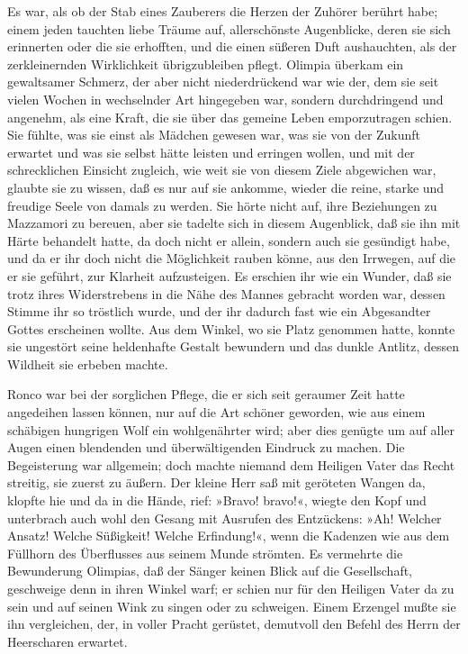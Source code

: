 \pagenum{[85]}Es war, als ob der Stab eines Zauberers die Herzen
der Zuhörer berührt habe; einem jeden tauchten liebe Träume auf,
allerschönste Augenblicke, deren sie sich erinnerten oder die sie
erhofften, und die einen süßeren Duft aushauchten, als der
zerkleinernden Wirklichkeit übrigzubleiben pflegt. Olimpia überkam
ein gewaltsamer Schmerz, der aber nicht niederdrückend war wie der,
dem sie seit vielen Wochen in wechselnder Art hingegeben war,
sondern durchdringend und angenehm, als eine Kraft, die sie über
das gemeine Leben emporzutragen schien. Sie fühlte, was sie einst
als Mädchen gewesen war, was sie von der Zukunft erwartet und was
sie selbst hätte leisten und erringen wollen, und mit der
schrecklichen Einsicht zugleich, wie weit sie von diesem Ziele
abgewichen war, glaubte sie zu wissen, daß es nur auf sie ankomme,
wieder die reine, starke und freudige Seele von damals zu werden.
Sie hörte nicht auf, ihre Beziehungen zu Mazzamori zu bereuen, aber
sie tadelte sich in diesem Augenblick, daß sie ihn mit Härte
behandelt hatte, da doch nicht er allein, sondern auch sie
gesündigt habe, und da er ihr doch nicht die Möglichkeit rauben
könne, aus den Irrwegen, auf die er sie geführt, zur Klarheit
aufzusteigen. Es erschien ihr wie ein Wunder, daß sie trotz ihres
Widerstrebens in die Nähe des Mannes gebracht worden war, dessen
Stimme ihr so tröstlich wurde, und der ihr dadurch fast wie ein
Abgesandter Gottes erscheinen wollte. Aus dem Winkel, wo sie Platz
genommen hatte, konnte sie ungestört seine heldenhafte Gestalt
bewundern und das dunkle Antlitz, dessen Wildheit sie erbeben
machte.

Ronco war bei der sorglichen Pflege, die er sich seit geraumer Zeit
hatte angedeihen lassen können, nur auf die Art schöner geworden,
wie aus einem schäbigen hungrigen\pagenum{[86]} Wolf ein
wohlgenährter wird; aber dies genügte um auf aller Augen einen
blendenden und überwältigenden Eindruck zu machen. Die Begeisterung
war allgemein; doch machte niemand dem Heiligen Vater das Recht
streitig, sie zuerst zu äußern. Der kleine Herr saß mit geröteten
Wangen da, klopfte hie und da in die Hände, rief: »Bravo! bravo!«,
wiegte den Kopf und unterbrach auch wohl den Gesang mit Ausrufen
des Entzückens: »Ah! Welcher Ansatz! Welche Süßigkeit! Welche
Erfindung!«, wenn die Kadenzen wie aus dem Füllhorn des Überflusses
aus seinem Munde strömten. Es vermehrte die Bewunderung Olimpias,
daß der Sänger keinen Blick auf die Gesellschaft, geschweige denn
in ihren Winkel warf; er schien nur für den Heiligen Vater da zu
sein und auf seinen Wink zu singen oder zu schweigen. Einem
Erzengel mußte sie ihn vergleichen, der, in voller Pracht gerüstet,
demutvoll den Befehl des Herrn der Heerscharen erwartet.

